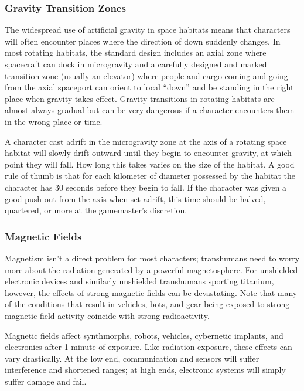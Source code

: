 \subsubsection{Gravity Transition Zones}


The widespread use of artificial gravity in space 
habitats means that characters will often encounter 
places where the direction of down suddenly changes. 
In most rotating habitats, the standard design includes
an axial zone where spacecraft can dock in
microgravity and a carefully designed and marked 
transition zone (usually an elevator) where people and 
cargo coming and going from the axial spaceport can 
orient to local ``down'' and be standing in the right 
place when gravity takes effect. Gravity transitions in 
rotating habitats are almost always gradual but can 
be very dangerous if a character encounters them in 
the wrong place or time.

A character cast adrift in the microgravity zone at 
the axis of a rotating space habitat will slowly drift 
outward until they begin to encounter gravity, at 
which point they will fall. How long this takes varies 
on the size of the habitat. A good rule of thumb is that 
for each kilometer of diameter possessed by the habitat
the character has 30 seconds before they begin to
fall. If the character was given a good push out from 
the axis when set adrift, this time should be halved, 
quartered, or more at the gamemaster's discretion.

\subsubsection{Magnetic Fields}

Magnetism isn't a direct problem for most characters; 
transhumans need to worry more about the radiation 
generated by a powerful magnetosphere. For unshielded
electronic devices and similarly unshielded
transhumans sporting titanium, however, the effects 
of strong magnetic fields can be devastating. Note that 
many of the conditions that result in vehicles, bots, 
and gear being exposed to strong magnetic field activity
coincide with strong radioactivity.

Magnetic fields affect synthmorphs, robots, vehicles, 
cybernetic implants, and electronics after 1 minute of 
exposure. Like radiation exposure, these effects can 
vary drastically. At the low end, communication and 
sensors will suffer interference and shortened ranges; 
at high ends, electronic systems will simply suffer 
damage and fail.


